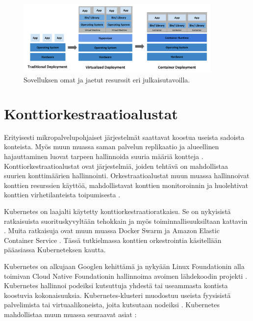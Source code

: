 \pagebreak %

\begin{figure}[ht]
\begin{center}
\includegraphics[width=0.9\textwidth]{figures/container_evolution.png}
\caption{Sovelluksen omat ja jaetut resurssit eri julkaisutavoilla.\cite{Kubernetes23}\label{fig:container}}
\end{center}
\end{figure}

\section{Konttiorkestraatioalustat\label{platforms}}

Erityisesti mikropalvelupohjaiset järjestelmät saattavat koostua useista sadoista konteista.
Myös muun muassa saman palvelun replikaatio ja alueellinen hajauttaminen luovat tarpeen hallinnoida suuria määriä kontteja \cite{Khan17}.
Konttiorkestraatioalustat ovat järjestelmiä, joiden tehtävä on mahdollistaa suurien konttimäärien hallinnointi.
Orkestraatioalustat muun muassa hallinnoivat konttien resurssien käyttöä, mahdollistavat konttien monitoroinnin ja huolehtivat konttien virhetilanteista toipumisesta \cite{Zhou21}.

Kubernetes on laajalti käytetty konttiorkestraatioratkaisu.
Se on nykyisistä ratkaisuista suorituskyvyltään tehokkain ja myös toiminnallisuuksiltaan kattavin \cite{Jawarneh19}.
Muita ratkaisuja ovat muun muassa Docker Swarm ja Amazon Elastic Container Service \cite{Khan17}.
Tässä tutkielmassa konttien orkestrointia käsitellään pääasiassa Kuberneteksen kautta.

Kubernetes on alkujaan Googlen kehittämä ja nykyään Linux Foundationin alla toimivan Cloud Native Foundationin hallinnoima avoimen lähdekoodin projekti \cite{Burns22}.
Kubernetes hallinnoi podeiksi kutsuttuja yhdestä tai useammasta kontista koostuvia kokonaisuuksia.
Kubernetes-klusteri muodostuu useista fyysisistä palvelimista tai virtuaalikoneista, joita kutsutaan nodeiksi \cite{Medel18}.
Kubernetes mahdollistaa muun muassa seuraavat asiat \cite{Zhou21}:

